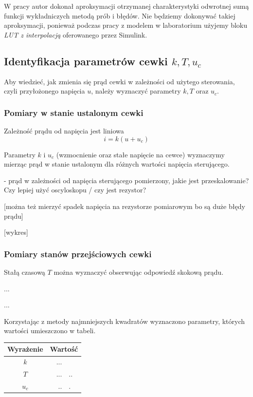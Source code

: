 W pracy \cite{Bania1999} autor dokonał aproksymacji otrzymanej charakterystyki odwrotnej sumą funkcji wykładniczych metodą prób i błędów. Nie będziemy dokonywać takiej aproksymacji, ponieważ podczas pracy z modelem w laboratorium użyjemy bloku \textit{LUT z interpolacją} oferowanego przez Simulink.



\subsection{Identyfikacja parametrów cewki $k, T, u_c$ }

Aby wiedzieć, jak zmienia się prąd cewki w zależności od użytego sterowania, czyli przyłożonego napięcia $u$, należy wyznaczyć parametry $k, T$ oraz $u_c$.

\subsubsection{Pomiary w stanie ustalonym cewki}

Zależność prądu od napięcia jest liniowa
\begin{equation}
i = k(u + u_c)
\end{equation}

Parametry $k$ i $u_c$ (wzmocnienie oraz stałe napięcie na cewce) wyznaczymy mierząc prąd w stanie ustalonym dla różnych wartości napięcia sterującego.

- prąd w zależności od napięcia sterującego pomierzony, jakie jest przeskalowanie? Czy lepiej użyć oscyloskopu / czy jest rezystor?

[można też mierzyć spadek napięcia na rezystorze pomiarowym bo są duże błędy prądu]

[wykres]

\subsubsection{Pomiary stanów przejściowych cewki}

Stałą czasową $T$ można wyznaczyć obserwując odpowiedź skokową prądu.


...

...





Korzystając z metody najmniejszych kwadratów wyznaczono parametry, których wartości umieszczono w tabeli.

\begin{tabular}{c r @{,} l}
Wyrażenie &
\multicolumn{2}{c}{Wartość}\\ \hline
$k$ & ... \\
$T$ & ...&.. \\
$u_c$ & ..&. \\
\end{tabular}



